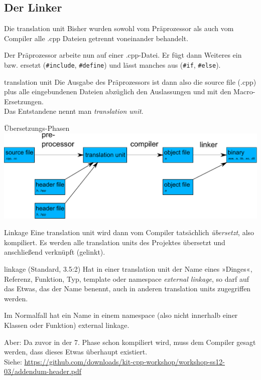 \subsection{Der Linker}

\begin{frame}[fragile]{Die translation unit}
	Bisher wurden sowohl vom Präprozessor als auch vom Compiler alle .cpp Dateien getrennt voneinander behandelt.
	
	Der Präprozessor arbeite nun auf einer .cpp-Datei. Er fügt dann Weiteres ein bzw. ersetzt (\verb|#include|, \verb|#define|) und lässt manches aus (\verb|#if|, \verb|#else|).
	
	\vspace{1em}
	
	\begin{block}{translation unit}
		Die Ausgabe des Präprozessors ist dann also die source file (.cpp) plus alle eingebundenen Dateien abzüglich den Auslassungen und mit den Macro-Ersetzungen.\\
		Das Entstandene nennt man \emph{translation unit}.
	\end{block}
\end{frame}

\begin{frame}[fragile]{Übersetzungs-Phasen}
	\includegraphics[width=\textwidth]{images/translation}
\end{frame}

\begin{frame}{Linkage}
	Eine translation unit wird dann vom Compiler tatsächlich \emph{übersetzt}, also kompiliert. Es werden alle translation units des Projektes übersetzt und anschließend verknüpft (gelinkt).
	
	\vspace{1em}
	
	\begin{block}{linkage (Standard, 3.5:2)}
		Hat in einer translation unit der Name eines »Dinges«, Referenz, Funktion, Typ, template oder namespace \emph{external linkage}, so darf auf das Etwas, das der Name benennt, auch in anderen translation units zugegriffen werden.
	\end{block}
	Im Normalfall hat ein Name in einem namespace (also nicht innerhalb einer Klassen oder Funktion) external linkage.
	
	\vspace{1em}
	\pause
	
	Aber: Da zuvor in der 7. Phase schon kompiliert wird, muss dem Compiler gesagt werden, dass dieses Etwas überhaupt existiert.\\
	\tiny
	Siehe: \url{https://github.com/downloads/kit-cpp-workshop/workshop-ss12-03/addendum-header.pdf}
\end{frame}

